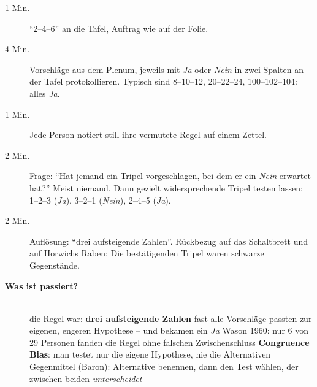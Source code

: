 \begin{lehrhinweis}
\begin{description}
  \item[1 Min.] \enquote{2--4--6} an die Tafel, Auftrag wie auf der Folie.
  \item[4 Min.] Vorschläge aus dem Plenum, jeweils mit \emph{Ja} oder
    \emph{Nein} in zwei Spalten an der Tafel protokollieren. Typisch sind
    8--10--12, 20--22--24, 100--102--104: alles \emph{Ja}.
  \item[1 Min.] Jede Person notiert still ihre vermutete Regel auf einem
    Zettel.
  \item[2 Min.] Frage: \enquote{Hat jemand ein Tripel vorgeschlagen, bei
    dem er ein \emph{Nein} erwartet hat?} Meist niemand. Dann gezielt
    widersprechende Tripel testen lassen: 1--2--3 (\emph{Ja}), 3--2--1
    (\emph{Nein}), 2--4--5 (\emph{Ja}).
  \item[2 Min.] Auflösung: \enquote{drei aufsteigende Zahlen}. Rückbezug
    auf das Schaltbrett und auf Horwichs Raben: Die bestätigenden Tripel
    waren schwarze Gegenstände.
\end{description}
\end{lehrhinweis}

\begin{description}
\item[{\rot\bf Was ist passiert?}]~\\[-\lblskip]
\bi
  \ite die Regel war: \textbf{drei aufsteigende Zahlen}
  \ite fast alle Vorschläge passten zur eigenen, engeren Hypothese -- und
    bekamen ein \emph{Ja}
  \ite Wason 1960: nur 6 von 29 Personen fanden die Regel ohne falschen
    Zwischenschluss
  \ite \textbf{Congruence Bias}: man testet nur die eigene Hypothese, nie
    die Alternativen
  \ite Gegenmittel (Baron): Alternative benennen, dann den Test wählen,
    der zwischen beiden \emph{unterscheidet}
\ei
\os{\newpage}
\end{description}

